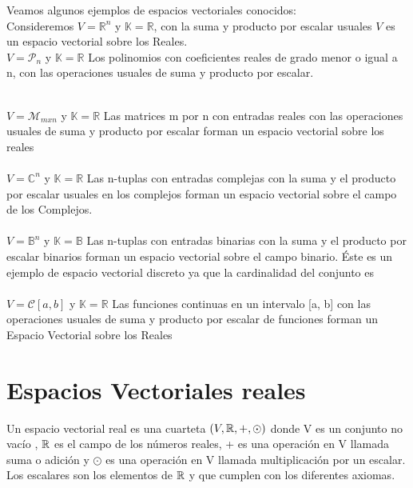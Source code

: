 Veamos algunos ejemplos de espacios vectoriales conocidos:
~\\
Consideremos $V=\mathbb{R}^n$ y $\mathbb{K}=\mathbb{R}$, con la suma y producto por escalar usuales $V$ es un espacio vectorial sobre los Reales.
~\\
$V=\mathcal{P}_n$
y $\mathbb{K}=\mathbb{R}$
Los polinomios con coeficientes reales de grado menor o igual a n, con las
operaciones usuales de suma y producto por escalar.

~\\
$V=\mathcal{M}_{mxn}$
y $\mathbb{K}=\mathbb{R}$
Las matrices m por n con entradas reales con las operaciones usuales
de suma y producto por escalar forman un espacio vectorial sobre los reales
~\\\\
$V=\mathbb{C}^n$
y $\mathbb{K}=\mathbb{R}$
Las n-tuplas con entradas complejas con la suma y el producto por escalar
usuales en los complejos forman un espacio vectorial sobre el campo de los Complejos.
~\\\\
$V=\mathbb{B}^n$
y $\mathbb{K}=\mathbb{B}$
Las n-tuplas con entradas binarias con la suma y el producto por escalar
binarios forman un espacio vectorial sobre el campo binario. Éste es un ejemplo de espacio
vectorial discreto ya que la cardinalidad del conjunto es
~\\\\
$V=\mathcal{C}[a,b]$
y $\mathbb{K}=\mathbb{R}$
Las funciones continuas en un intervalo [a, b] con las operaciones
usuales de suma y producto por escalar de funciones forman un Espacio Vectorial sobre los
Reales


\section{Espacios Vectoriales reales}

\begin{dfn}
Un espacio vectorial real es una cuarteta $(V, \mathbb{R}, +, \odot)$ donde V es un conjunto no vacío , $\mathbb{R}$ es el campo de los números reales, + es una operación en V llamada suma o adición y $\odot$ es una operación en V llamada multiplicación por un escalar. Los escalares son los elementos de $\mathbb{R}$ y que cumplen con los diferentes axiomas. 


\end{dfn}
